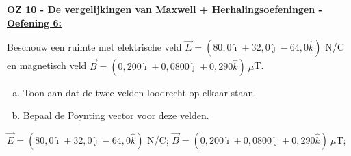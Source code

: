 \textbf{\underline{OZ 10 - De vergelijkingen van Maxwell + Herhalingsoefeningen - Oefening 6:}}
\vspace{0.5cm}

Beschouw een ruimte met elektrische veld $ \vec{E} = \left(80,0 \hat{\imath} + 32,0 \hat{\jmath} - 64,0 \hat{k} \right) $ N/C en magnetisch veld $ \vec{B} = \left(0,200 \hat{\imath} + 0,0800 \hat{\jmath} + 0,290 \hat{k} \right) \ \mu$T.

\begin{enumerate}[(a)]
    \item Toon aan dat de twee velden loodrecht op elkaar staan.
    \item Bepaal de Poynting vector voor deze velden.
\end{enumerate}

\begin{description}[labelwidth=1.5cm, leftmargin=!]
    \item[Geg. :]   $ \vec{E} = \left(80,0 \hat{\imath} + 32,0 \hat{\jmath} - 64,0 \hat{k} \right) $ N/C; $ \vec{B} = \left(0,200 \hat{\imath} + 0,0800 \hat{\jmath} + 0,290 \hat{k} \right) \ \mu$T;
\end{description}

